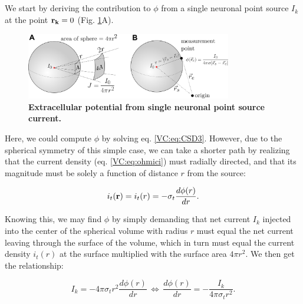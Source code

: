 \subsection{}
\label{sec:VC:pointsource}

We start by deriving the contribution to $\phi$ from a single neuronal point source $I_k$ at the point ${\bf r_k}=0$ (Fig. \ref{VC:fig:pointsource}A). 

\begin{figure}[!ht]
\begin{center}
\includegraphics[width=0.8\textwidth]{Figures/VC/EP_from_pointsource_illustration.png}
\end{center}
\caption{\textbf{Extracellular potential from single neuronal point source current.} 
 
}
\label{VC:fig:pointsource}
\end{figure}

Here, we could compute $\phi$ by solving eq. \ref{VC:eq:CSD3}. However, due to the spherical symmetry of this simple case, we can take a shorter path by realizing that the current density (eq. \ref{VC:eq:ohmici}) must radially directed, and that its magnitude must be solely a function of distance $r$ from the source:

\begin{equation}
i_t({\bf r}) = i_t(r) = -\sigma_t \frac{d\phi(r)}{dr}.
\end{equation}

Knowing this, we may find $\phi$ by simply demanding that net current $I_k$ injected into the center of the spherical volume with radius $r$ must equal the net current leaving through the surface of the volume, which in turn must equal the current density $i_t(r)$ at the surface multiplied with the surface area $4\pi r^2$. We then get the relationship:

\begin{equation}
I_k = -4\pi \sigma_t r^2  \frac{d\phi(r)}{dr} \, \iff \, \frac{d\phi(r)}{dr} = -\frac{I_k}{4\pi \sigma_t r^2 }.
\label{VC:eq:knut}
\end{equation}

